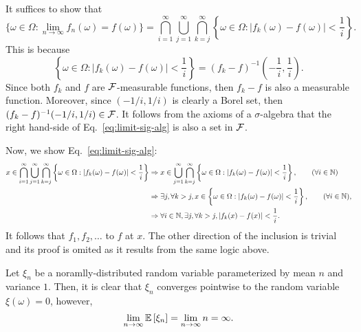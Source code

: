 \begin{problem}{1}
\end{problem}
\begin{solution}
    It suffices to show that 
    \begin{equation}\label{eq:limit-sig-alg}
        \{\omega \in \Omega: \lim_{n\to\infty} f_n(\omega) = f(\omega)\} = \bigcap_{i=1}^\infty \bigcup_{j=1}^\infty \bigcap_{k=j}^\infty \left\{\omega \in \Omega : |f_k(\omega) - f(\omega)| < \frac{1}{i}\right\}.
    \end{equation}
    This is because
    \[
        \left\{\omega \in \Omega : |f_k(\omega) - f(\omega)| < \frac{1}{i}\right\} =  (f_k - f)^{-1}\left(-\frac{1}{i},\frac{1}{i}\right).
    \]
    Since both $f_k$ and $f$ are $\mathcal{F}$-measurable functions, then $f_k - f$ is also a measurable function. Moreover, since $(-1/i, 1/i)$ is clearly a Borel set, then $(f_k - f)^{-1}(-1/i, 1/i) \in \mathcal{F}$. It follows from the axioms of a $\sigma$-algebra that the right hand-side of Eq.~\ref{eq:limit-sig-alg} is also a set in $\mathcal{F}$. 

    Now, we show Eq.~\ref{eq:limit-sig-alg}:
    \begin{align*}
        x \in \bigcap_{i=1}^\infty \bigcup_{j=1}^\infty \bigcap_{k=j}^\infty \left\{\omega \in \Omega : |f_k(\omega) - f(\omega)| < \frac{1}{i}\right\} &\Rightarrow x \in \bigcup_{j=1}^\infty\bigcap_{k=j}^\infty \left\{\omega \in \Omega : |f_k(\omega) - f(\omega)| <  \frac{1}{i}\right\}, \tag{$\forall i \in \N$} \\
        &\Rightarrow \exists j, \forall k > j, x\in \left\{\omega \in \Omega : |f_k(\omega) - f(\omega)| <  \frac{1}{i}\right\}, \tag{$\forall i \in \N$}, \\
        &\Rightarrow \forall i \in \N, \exists j, \forall k > j, |f_k(x) - f(x)| < \frac{1}{i}.
    \end{align*}
    It follows that $f_1,f_2,\ldots$ to $f$ at $x$. The other direction of the inclusion is trivial and its proof is omited as it results from the same logic above.
\end{solution}

\begin{problem}{2}
\end{problem}
\begin{solution}
    
\end{solution}

\begin{problem}{3}
\end{problem}
\begin{solution}
    Let $\xi_n$ be a noramlly-distributed random variable parameterized by mean $n$ and variance $1$. Then, it is clear that $\xi_n$ converges pointwise to the random variable $\xi(\omega) = 0$, however, 
    \[
        \lim_{n\to\infty} \mathbb{E}\left[\xi_n\right] = \lim_{n\to\infty} n = \infty.
    \]
\end{solution}

